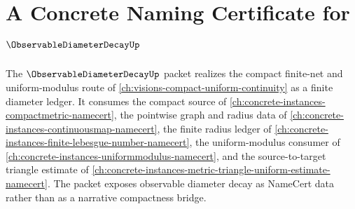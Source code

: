 \chapter{A Concrete Naming Certificate for $\ObservableDiameterDecayUp$}
\label{ch:concrete-instances-observable-diameter-decay-namecert}

The $\ObservableDiameterDecayUp$ packet realizes the compact finite-net and uniform-modulus route of \autoref{ch:visions-compact-uniform-continuity} as a finite diameter ledger. It consumes the compact source of \autoref{ch:concrete-instances-compactmetric-namecert}, the pointwise graph and radius data of \autoref{ch:concrete-instances-continuousmap-namecert}, the finite radius ledger of \autoref{ch:concrete-instances-finite-lebesgue-number-namecert}, the uniform-modulus consumer of \autoref{ch:concrete-instances-uniformmodulus-namecert}, and the source-to-target triangle estimate of \autoref{ch:concrete-instances-metric-triangle-uniform-estimate-namecert}. The packet exposes observable diameter decay as NameCert data rather than as a narrative compactness bridge.


